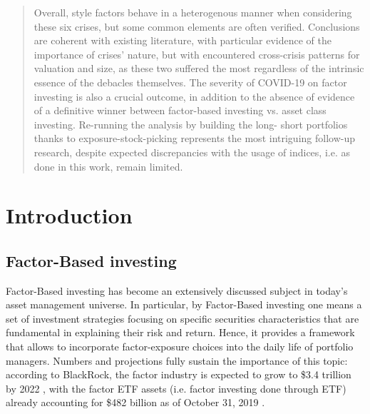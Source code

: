 \documentclass[12pt]{article}
\begin{document}
\begin{abstract}
Overall, style factors behave in a heterogenous manner when considering these six crises, but some common elements are often verified. Conclusions are coherent with existing literature, with particular evidence of the importance of crises’ nature, but with encountered cross-crisis patterns for valuation and size, as these two suffered the most regardless of the intrinsic essence of the debacles themselves. The severity of COVID-19 on factor investing is also a crucial outcome, in addition to the absence of evidence of a definitive winner between factor-based investing vs. asset class investing. Re-running the analysis by building the long- short portfolios thanks to exposure-stock-picking represents the most intriguing follow-up research, despite expected discrepancies with the usage of indices, i.e. as done in this work, remain limited.
\end{abstract}

\newpage

\tableofcontents
\setcounter{page}{1}


\newpage

\newpage
\section{Introduction} \label{section:1}

\subsection{Factor-Based investing}
Factor-Based investing has become an extensively discussed subject in today's asset management universe. In particular, by Factor-Based investing one means a set of investment strategies focusing on specific securities characteristics that are fundamental in explaining their risk and return. Hence, it provides a framework that allows to incorporate factor-exposure choices into the daily life of portfolio managers. Numbers and projections fully sustain the importance of this topic: according to BlackRock, the factor industry is expected to grow to \$3.4 trillion by 2022 \cite{what_is_factor_investing}, with the factor ETF assets (i.e. factor investing done through ETF) already accounting for \$482 billion as of October 31, 2019 \cite{factor_capacity}.
\end{document}

